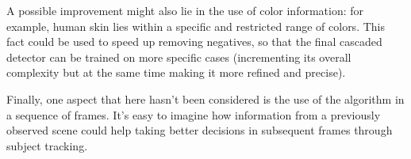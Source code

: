 \documentclass[a4paper,11pt,titlepage]{article}
\begin{document}
A possible improvement might also lie in the use of color information: for
example, human skin lies within a specific and restricted range of colors. This
fact could be used to speed up removing negatives, so that the final cascaded
detector can be trained on more specific cases (incrementing its overall
complexity but at the same time making it more refined and precise).

Finally, one aspect that here hasn't been considered is the use of the algorithm
in a sequence of frames. It's easy to imagine how information from a
previously observed scene could help taking better decisions in subsequent
frames through subject tracking.



\end{document}
